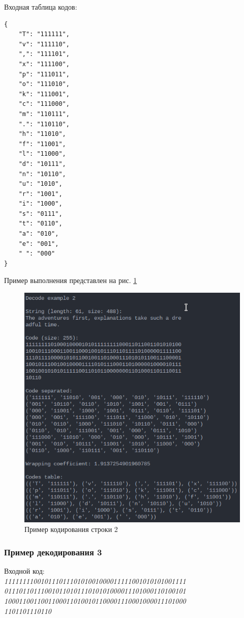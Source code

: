 Входная таблица кодов:\\ 
\begin{lstlisting}
{
    "T": "111111",
    "v": "111110",
    ",": "111101",
    "x": "111100",
    "p": "111011",
    "o": "111010",
    "k": "111001",
    "c": "111000",
    "m": "110111",
    ".": "110110",
    "h": "11010",
    "f": "11001",
    "l": "11000",
    "d": "10111",
    "n": "10110",
    "u": "1010",
    "r": "1001",
    "i": "1000",
    "s": "0111",
    "t": "0110",
    "a": "010",
    "e": "001",
    " ": "000"
}
\end{lstlisting}

Пример выполнения представлен на рис. \ref{fig:decode_example_2}

\begin{figure}[H]
    \centering
    \includegraphics[width=0.7\linewidth]{photo/decode_example_2}
    \caption{Пример кодирования строки 2}
    \label{fig:decode_example_2}
\end{figure}

\subsubsection*{Пример декодирования 3}

Входной код:\\ 
\textit{
11111111001011101110101001000011111001010101001111\\
01110110111001011010111010101000011101000110100101\\
10001100110011000110100101100001110001000011101000\\
1101101110110
}

